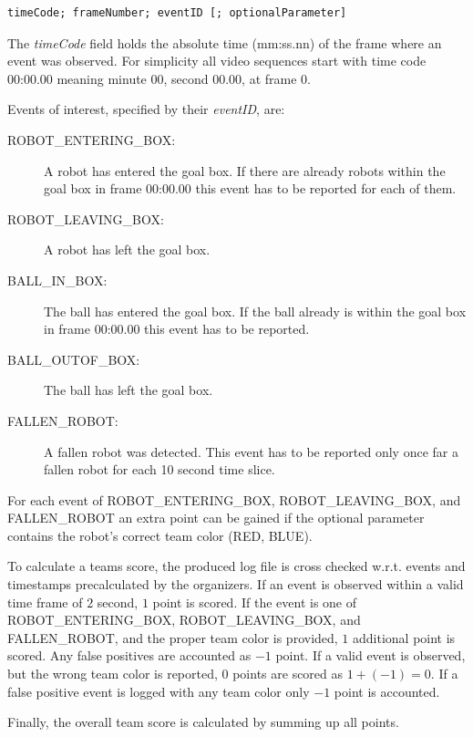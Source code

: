 \documentclass[12pt]{article}
\begin{document}
\begin{verbatim}
timeCode; frameNumber; eventID [; optionalParameter]	
\end{verbatim}

The \emph{timeCode} field holds the absolute time (mm:ss.nn) of the frame where an event was observed. For simplicity all video sequences start with time code 00:00.00 meaning minute 00, second 00.00, at frame $0$.

Events of interest, specified by their \emph{eventID}, are:

\begin{description}
	\item[ROBOT\_ENTERING\_BOX:] A robot has entered the goal box. If there are already robots within the goal box in frame 00:00.00 this event has to be reported for each of them.
	\item[ROBOT\_LEAVING\_BOX:] A robot has left the goal box. 
	\item[BALL\_IN\_BOX:] The ball has entered the goal box. If the ball already is within the goal box in frame 00:00.00 this event has to be reported.
	\item[BALL\_OUTOF\_BOX:] The ball has left the goal box.
	\item[FALLEN\_ROBOT:] A fallen robot was detected. This event has to be reported only once far a fallen robot for each 10 second time slice.
\end{description}

For each event of ROBOT\_ENTERING\_BOX, ROBOT\_LEAVING\_BOX, and FALLEN\_ROBOT an extra point can be gained if the optional parameter contains the robot's correct team color (RED, BLUE). 

To calculate a teams score, the produced log file is cross checked w.r.t. events and timestamps precalculated by the organizers. If an event is observed within a valid time frame of $2$ second, $1$ point is scored. If the event is one of ROBOT\_ENTERING\_BOX, ROBOT\_LEAVING\_BOX, and FALLEN\_ROBOT, and the proper team color is provided, $1$ additional point is scored. Any false positives are accounted as $-1$ point. If a valid event is observed, but the wrong team color is reported, $0$ points are scored as $1+(-1)=0$. If a false positive event is logged with any team color only $-1$ point is accounted. 

Finally, the overall team score is calculated by summing up all points.


\newpage


\end{document}
